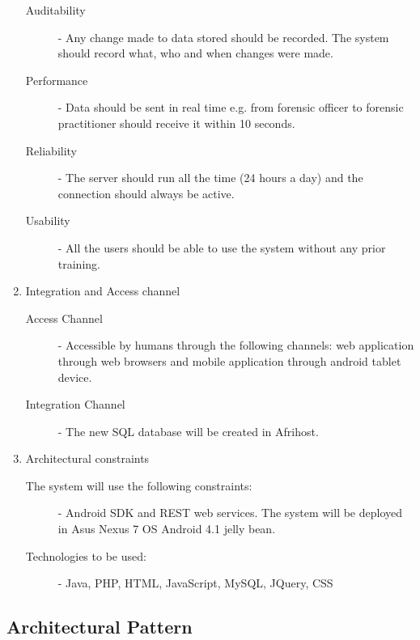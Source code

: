 \documentclass[10pt,a4paper]{article}
\begin{document}
\begin{enumerate}
\begin{description}
\item [Auditability]
- Any change made to data stored should be recorded.
The system should record what, who and when changes were made.


\item [Performance]
- Data should be sent in real time e.g. from forensic officer to forensic practitioner should receive it within 10 seconds.


\item [Reliability]
- The server should run all the time (24 hours a day) and the connection should always be active.


\item [Usability]
- All the users should be able to use the system without any prior training.


\end{description}

\item Integration and Access channel
\begin{description}
\item [Access Channel]
- Accessible by humans through the following channels:	web application through web browsers and mobile application through android tablet device.


\item [Integration Channel]
- The new SQL database will be created in Afrihost.

\end{description}

\item Architectural constraints
\begin{description}
\item [The system will use the following constraints:]
- Android SDK and
REST web services.
The system will be deployed in Asus Nexus 7 OS Android 4.1 jelly bean.


\item [Technologies to be used:]
- Java, PHP, HTML, JavaScript, MySQL,  JQuery, CSS

\end{description}

\end{enumerate}
\subsection{Architectural Pattern}
\end{document}
